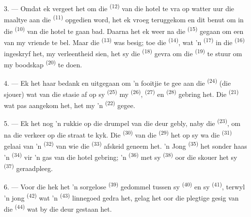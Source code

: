 3. --- Omdat ek vergeet het om die  \textsuperscript{(12)} van die hotel
te vra op watter uur die maaltye aan die 
\textsuperscript{(11)} opgedien word, het ek vroeg teruggekom en dit benut om in die
 \textsuperscript{(10)} van die hotel te gaan bad. Daarna het ek weer na
die  \textsuperscript{(15)} gegaan om een van my vriende te bel. Maar die
 \textsuperscript{(13)} was besig; toe die 
\textsuperscript{(14)}, wat 'n  \textsuperscript{(17)} in die
 \textsuperscript{(16)} ingeskryf het, my verleentheid sien,
het sy die  \textsuperscript{(18)} gevra om die 
\textsuperscript{(19)} te stuur om my boodskap  \textsuperscript{(20)}
te doen.

4. --- Ek het haar bedank en uitgegaan om 'n fooitjie te gee aan die 
\textsuperscript{(24)} (die sjouer) wat van die stasie af op sy 
\textsuperscript{(25)} my  \textsuperscript{(26)}, 
\textsuperscript{(27)} en  \textsuperscript{(28)} gebring het. Die
 \textsuperscript{(21)} wat pas aangekom het, het my 'n
 \textsuperscript{(22)} gegee.

5. --- Ek het nog 'n rukkie op die drumpel van die deur gebly, naby die
 \textsuperscript{(23)}, om na die verkeer op die straat te kyk. Die
 \textsuperscript{(30)} van die 
\textsuperscript{(29)} het op sy wa die  \textsuperscript{(31)} gelaai van
'n  \textsuperscript{(32)} van wie die 
\textsuperscript{(33)} afskeid geneem het. 'n Jong 
\textsuperscript{(35)} het sonder haas 'n  \textsuperscript{(34)} vir 'n
gas van die hotel gebring; 'n  \textsuperscript{(36)} met sy
 \textsuperscript{(38)} oor die skouer het sy 
\textsuperscript{(37)} geraadpleeg.

\VUsaut{4.0mm}
\VUsaut{3.0mm}

6. --- Voor die hek het 'n sorgelose  \textsuperscript{(39)}
gedommel tussen sy  \textsuperscript{(40)} en sy 
\textsuperscript{(41)}, terwyl 'n jong  \textsuperscript{(42)} wat 'n
 \textsuperscript{(43)} linnegoed gedra het, gelag het oor die plegtige
gesig van die  \textsuperscript{(44)} wat by die deur gestaan het.

